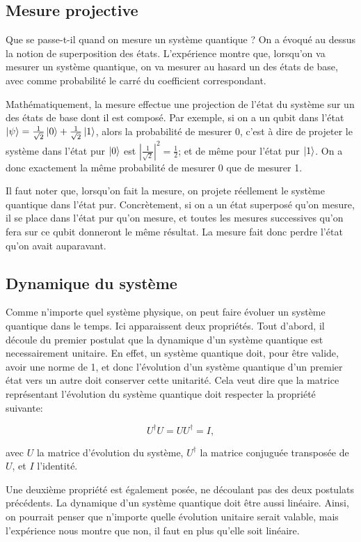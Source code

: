 \subsection{Mesure projective}
Que se passe-t-il quand on mesure un système quantique ? On a évoqué au dessus la notion de superposition des états. L'expérience montre que, lorsqu'on va mesurer un système quantique, on va mesurer au hasard un des états de base, avec comme probabilité le carré du coefficient correspondant.

Mathématiquement, la mesure effectue une projection de l'état du système sur un des états de base dont il est composé. Par exemple, si on a un qubit dans l'état $\ket{\psi} = \frac{1}{\sqrt{2}}\ket{0} + \frac{1}{\sqrt{2}}\ket{1}$, alors la probabilité de mesurer 0, c'est à dire de projeter le système dans l'état pur $\ket{0}$ est $|\frac{1}{\sqrt{2}}|^2 = \frac{1}{2}$; et de même pour l'état pur $\ket{1}$. On a donc exactement la même probabilité de mesurer 0 que de mesurer 1.

Il faut noter que, lorsqu'on fait la mesure, on projete réellement le système quantique dans l'état pur. Concrètement, si on a un état superposé qu'on mesure, il se place dans l'état pur qu'on mesure, et toutes les mesures successives qu'on fera sur ce qubit donneront le même résultat. La mesure fait donc perdre l'état qu'on avait auparavant.

\subsection{Dynamique du système}
Comme n'importe quel système physique, on peut faire évoluer un système quantique dans le temps. Ici apparaissent deux propriétés. Tout d'abord, il découle du premier postulat que la dynamique d'un système quantique est necessairement unitaire. En effet, un système quantique doit, pour être valide, avoir une norme de 1, et donc l'évolution d'un système quantique d'un premier état vers un autre doit conserver cette unitarité. Cela veut dire que la matrice représentant l'évolution du système quantique doit respecter la propriété suivante:

\begin{equation}
    U^{\dagger}U = UU^{\dagger} = I,
\end{equation}

avec $U$ la matrice d'évolution du système, $U^{\dagger}$ la matrice conjuguée transposée de $U$, et $I$ l'identité.

Une deuxième propriété est également posée, ne découlant pas des deux postulats précédents. La dynamique d'un système quantique doit être aussi linéaire. Ainsi, on pourrait penser que n'importe quelle évolution unitaire serait valable, mais l'expérience nous montre que non, il faut en plus qu'elle soit linéaire.

